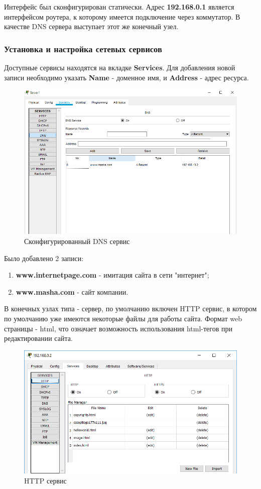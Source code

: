 \documentclass[14pt,a4paper,report]{report}
\begin{document}
Интерфейс был сконфигурирован статически. Адрес \textbf{192.168.0.1} является интерфейсом роутера, к которому имеется подключение через коммутатор. В качестве DNS сервера выступает этот же конечный узел.

\clearpage

\subsubsection{Установка и настройка сетевых сервисов}
Доступные сервисы находятся на вкладке \textbf{Services}. Для добавления новой записи необходимо указать \textbf{Name} - доменное имя, и \textbf{Address} - адрес ресурса.
\begin{figure}[h]
  \centering
  \includegraphics[width=.8\textwidth]{img/1}
  \caption{Сконфигурированный DNS сервис}
\end{figure}
Было добавлено 2 записи:
\begin{enumerate}
\item \textbf{www.internetpage.com} - имитация сайта в сети "интернет";
\item \textbf{www.masha.com} - сайт компании.
\end{enumerate}
В конечных узлах типа - сервер, по умолчанию включен HTTP сервис, в котором по умолчанию уже имеются некоторые файлы для работы сайта. Формат web страницы - html, что означает возможность использования html-тегов при редактировании сайта.

\begin{figure}[h]
  \centering
  \includegraphics[width=.8\textwidth]{img/net0_0_2__4}
  \caption{HTTP сервис}
\end{figure}
\end{document}
